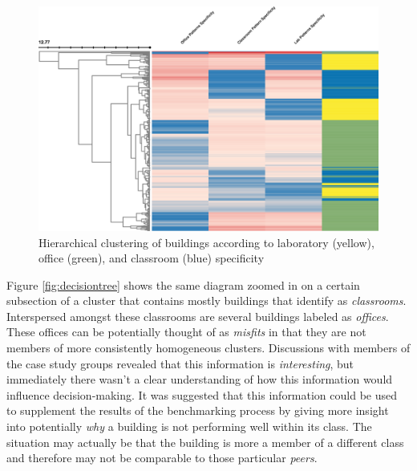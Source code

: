 \begin{figure}[ht!]
\begin{center}
\includegraphics[width=1\columnwidth]{figures/clustering_weekly/clustering_weekly}
\caption{{Hierarchical clustering of buildings according to laboratory (yellow), office (green), and classroom (blue) specificity
\label{fig:specificity_high}%
}}
\end{center}
\end{figure}

Figure \ref{fig:decisiontree} shows the same diagram zoomed in on a certain subsection of a cluster that contains mostly buildings that identify as \emph{classrooms}. Interspersed amongst these classrooms are several buildings labeled as \emph{offices}. These offices can be potentially thought of as \emph{misfits} in that they are not members of more consistently homogeneous clusters. Discussions with members of the case study groups revealed that this information is \emph{interesting}, but immediately there wasn't a clear understanding of how this information would influence decision-making. It was suggested that this information could be used to supplement the results of the benchmarking process by giving more insight into potentially \emph{why} a building is not performing well within its class. The situation may actually be that the building is more a member of a different class and therefore may not be comparable to those particular \emph{peers}.

